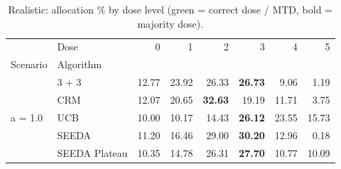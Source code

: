 \begin{table}[H]
\centering
\caption{Realistic: allocation \% by dose level (green = correct dose / MTD, bold = majority dose).}
\label{tab:real_alloc_by_dose}
\begin{tabular}{llrrrrrr}
\toprule
 & Dose & 0 & 1 & 2 & 3 & 4 & 5 \\
Scenario & Algorithm &  &  &  &  &  &  \\
\midrule
\multirow[c]{5}{*}{a = 1.0} & 3 + 3 & 12.77 & 23.92 & {\cellcolor[HTML]{C8E6C9}} 26.33 & \bfseries 26.73 & 9.06 & 1.19 \\
 & CRM & 12.07 & 20.65 & {\cellcolor[HTML]{C8E6C9}} \bfseries 32.63 & 19.19 & 11.71 & 3.75 \\
 & UCB & 10.00 & 10.17 & {\cellcolor[HTML]{C8E6C9}} 14.43 & \bfseries 26.12 & 23.55 & 15.73 \\
 & SEEDA & 11.20 & 16.46 & {\cellcolor[HTML]{C8E6C9}} 29.00 & \bfseries 30.20 & 12.96 & 0.18 \\
 & SEEDA Plateau & 10.35 & 14.78 & {\cellcolor[HTML]{C8E6C9}} 26.31 & \bfseries 27.70 & 10.77 & 10.09 \\
\bottomrule
\end{tabular}
\end{table}
